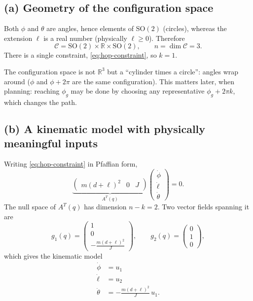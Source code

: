 \documentclass[11pt,a4paper]{article}
\def\boldsymbol#1{#1}%
\newcommand{\R}{\mathbb{R}}
\newcommand{\SO}{\mathrm{SO}}
\newcommand{\q}{\boldsymbol{q}}
\newcommand{\g}{\boldsymbol{g}}
\theoremstyle{definition}
\theoremstyle{plain}
\theoremstyle{remark}
\begin{document}
\subsection{(a) Geometry of the configuration space}

Both $\phi$ and $\theta$ are angles, hence elements of $\SO(2)$ (circles), whereas the extension $\ell$ is a real number (physically $\ell\ge0$). Therefore
\[
  \mathcal C=\SO(2)\times\R\times\SO(2),\qquad n=\dim\mathcal C=3 .
\]
There is a single constraint, \eqref{eq:hop-constraint}, so $k=1$.

\begin{intuition}
The configuration space is not $\R^3$ but a ``cylinder times a circle'': angles wrap around ($\phi$ and $\phi+2\pi$ are the same configuration). This matters later, when planning: reaching $\phi_g$ may be done by choosing any representative $\phi_g+2\pi k$, which changes the path.
\end{intuition}

\subsection{(b) A kinematic model with physically meaningful inputs}

Writing \eqref{eq:hop-constraint} in Pfaffian form,
\begin{equation}
  \underbrace{\begin{pmatrix} m(d+\ell)^2 & 0 & J\end{pmatrix}}_{A^T(\q)}
  \begin{pmatrix}\dot\phi\\ \dot\ell\\ \dot\theta\end{pmatrix}=0 .
\end{equation}
The null space of $A^T(\q)$ has dimension $n-k=2$. Two vector fields spanning it are
\begin{equation}
  \g_1(\q)=\begin{pmatrix}1\\0\\ -\frac{m(d+\ell)^2}{J}\end{pmatrix},\qquad
  \g_2(\q)=\begin{pmatrix}0\\1\\0\end{pmatrix},
\end{equation}
which gives the kinematic model
\begin{equation}
\boxed{\;
\begin{aligned}
  \dot\phi&=u_1\\
  \dot\ell&=u_2\\
  \dot\theta&=-\frac{m(d+\ell)^2}{J}\,u_1 .
\end{aligned}\;}
\label{eq:hop-km}
\end{equation}
\end{document}
